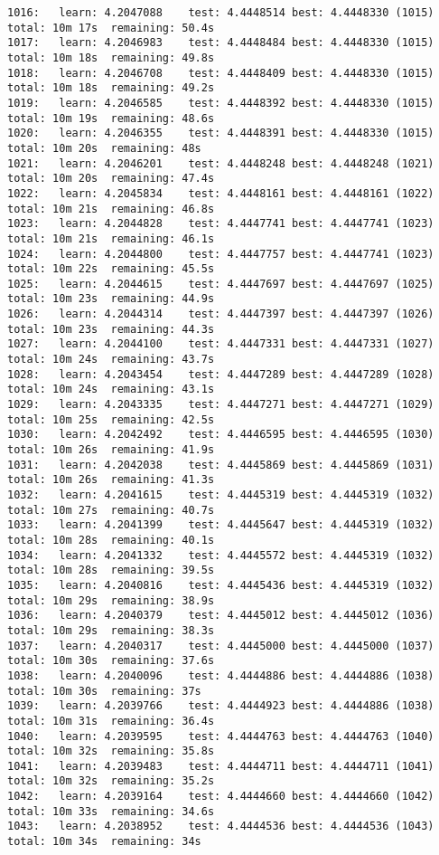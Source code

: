 \documentclass[11pt]{article}
\begin{document}
\begin{Verbatim}[commandchars=\\\{\}]
1016:	learn: 4.2047088	test: 4.4448514	best: 4.4448330 (1015)	total: 10m 17s	remaining: 50.4s
1017:	learn: 4.2046983	test: 4.4448484	best: 4.4448330 (1015)	total: 10m 18s	remaining: 49.8s
1018:	learn: 4.2046708	test: 4.4448409	best: 4.4448330 (1015)	total: 10m 18s	remaining: 49.2s
1019:	learn: 4.2046585	test: 4.4448392	best: 4.4448330 (1015)	total: 10m 19s	remaining: 48.6s
1020:	learn: 4.2046355	test: 4.4448391	best: 4.4448330 (1015)	total: 10m 20s	remaining: 48s
1021:	learn: 4.2046201	test: 4.4448248	best: 4.4448248 (1021)	total: 10m 20s	remaining: 47.4s
1022:	learn: 4.2045834	test: 4.4448161	best: 4.4448161 (1022)	total: 10m 21s	remaining: 46.8s
1023:	learn: 4.2044828	test: 4.4447741	best: 4.4447741 (1023)	total: 10m 21s	remaining: 46.1s
1024:	learn: 4.2044800	test: 4.4447757	best: 4.4447741 (1023)	total: 10m 22s	remaining: 45.5s
1025:	learn: 4.2044615	test: 4.4447697	best: 4.4447697 (1025)	total: 10m 23s	remaining: 44.9s
1026:	learn: 4.2044314	test: 4.4447397	best: 4.4447397 (1026)	total: 10m 23s	remaining: 44.3s
1027:	learn: 4.2044100	test: 4.4447331	best: 4.4447331 (1027)	total: 10m 24s	remaining: 43.7s
1028:	learn: 4.2043454	test: 4.4447289	best: 4.4447289 (1028)	total: 10m 24s	remaining: 43.1s
1029:	learn: 4.2043335	test: 4.4447271	best: 4.4447271 (1029)	total: 10m 25s	remaining: 42.5s
1030:	learn: 4.2042492	test: 4.4446595	best: 4.4446595 (1030)	total: 10m 26s	remaining: 41.9s
1031:	learn: 4.2042038	test: 4.4445869	best: 4.4445869 (1031)	total: 10m 26s	remaining: 41.3s
1032:	learn: 4.2041615	test: 4.4445319	best: 4.4445319 (1032)	total: 10m 27s	remaining: 40.7s
1033:	learn: 4.2041399	test: 4.4445647	best: 4.4445319 (1032)	total: 10m 28s	remaining: 40.1s
1034:	learn: 4.2041332	test: 4.4445572	best: 4.4445319 (1032)	total: 10m 28s	remaining: 39.5s
1035:	learn: 4.2040816	test: 4.4445436	best: 4.4445319 (1032)	total: 10m 29s	remaining: 38.9s
1036:	learn: 4.2040379	test: 4.4445012	best: 4.4445012 (1036)	total: 10m 29s	remaining: 38.3s
1037:	learn: 4.2040317	test: 4.4445000	best: 4.4445000 (1037)	total: 10m 30s	remaining: 37.6s
1038:	learn: 4.2040096	test: 4.4444886	best: 4.4444886 (1038)	total: 10m 30s	remaining: 37s
1039:	learn: 4.2039766	test: 4.4444923	best: 4.4444886 (1038)	total: 10m 31s	remaining: 36.4s
1040:	learn: 4.2039595	test: 4.4444763	best: 4.4444763 (1040)	total: 10m 32s	remaining: 35.8s
1041:	learn: 4.2039483	test: 4.4444711	best: 4.4444711 (1041)	total: 10m 32s	remaining: 35.2s
1042:	learn: 4.2039164	test: 4.4444660	best: 4.4444660 (1042)	total: 10m 33s	remaining: 34.6s
1043:	learn: 4.2038952	test: 4.4444536	best: 4.4444536 (1043)	total: 10m 34s	remaining: 34s

\end{Verbatim}
\end{document}
